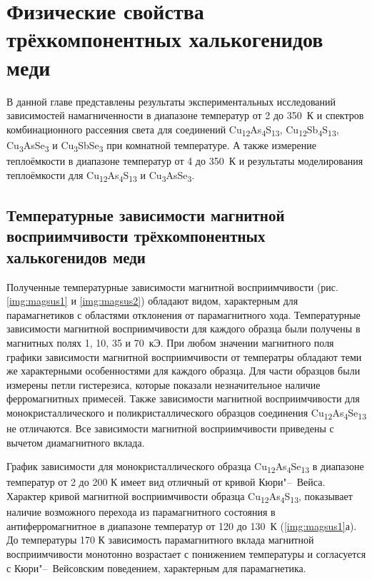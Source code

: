 \chapter{Физические свойства трёхкомпонентных халькогенидов меди} \label{chapt4}
В данной главе представлены результаты экспериментальных исследований зависимостей намагниченности в диапазоне температур от 2 до 350~К и спектров комбинационного рассеяния света для соединений Cu\textsubscript{12}As\textsubscript{4}S\textsubscript{13}, Cu\textsubscript{12}Sb\textsubscript{4}S\textsubscript{13}, Cu\textsubscript{3}AsSe\textsubscript{3} и Cu\textsubscript{3}SbSe\textsubscript{3} при комнатной температуре. А также измерение теплоёмкости в диапазоне температур от 4 до 350~К и результаты моделирования теплоёмкости для Cu\textsubscript{12}As\textsubscript{4}S\textsubscript{13} и Cu\textsubscript{3}AsSe\textsubscript{3}.

\section{Температурные зависимости магнитной восприимчивости трёхкомпонентных халькогенидов меди} \label{sect4_1}

Полученные температурные зависимости магнитной восприимчивости (рис. \ref{img:magsus1} и \ref{img:magsus2}) обладают видом, характерным для парамагнетиков с областями отклонения от парамагнитного хода.  Температурные зависимости магнитной восприимчивости для каждого образца были получены в магнитных полях 1, 10, 35 и 70~кЭ. При любом значении магнитного поля графики зависимости магнитной восприимчивости от температры обладают теми же характерными особенностями для каждого образца. Для части образцов были измерены петли гистерезиса, которые показали незначительное наличие ферромагнитных примесей. Также зависимости магнитной восприимчивости для монокристаллического и поликристаллического образцов соединения Cu\textsubscript{12}As\textsubscript{4}Se\textsubscript{13} не отличаются. Все зависимости магнитной восприимчивости приведены с вычетом диамагнитного вклада.

График зависимости для монокристаллического образца Cu\textsubscript{12}As\textsubscript{4}Se\textsubscript{13} в диапазоне температур от 2 до 200 К имеет вид отличный от кривой Кюри"--~Вейса.
 Характер кривой магнитной восприимчивости образца  Cu\textsubscript{12}As\textsubscript{4}S\textsubscript{13}, показывает наличие возможного перехода из парамагнитного состояния в антиферромагнитное в диапазоне температур от 120 до 130~К (\ref{img:magsus1}а).
До температуры 170 К зависимость парамагнитного вклада магнитной восприимчивости монотонно возрастает с понижением температуры и согласуется с Кюри"--~Вейсовским поведением, характерным для парамагнетика.

